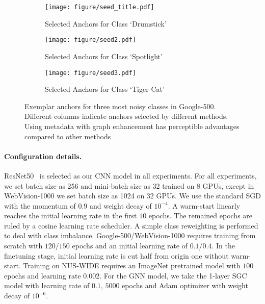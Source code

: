 \documentclass[sigconf]{acmart}
\begin{document}
\begin{figure*}[t]
	\centering
	\begin{subfigure}{\textwidth}
		\centering
\texttt{[image: figure/seed\_title.pdf]}  
\caption{Selected Anchors for Class `Drumstick'}
\label{fig:anchor_drumstick}
	\end{subfigure}
	\begin{subfigure}{\textwidth}
		\centering
\texttt{[image: figure/seed2.pdf]}  
\caption{Selected Anchors for Class `Spotlight'}
\label{fig:anchor_spotlight}
	\end{subfigure}
	
	\begin{subfigure}{\textwidth}
		\centering
\texttt{[image: figure/seed3.pdf]}  
\caption{Selected Anchors for Class `Tiger Cat'}
\label{fig:anchor_tigercat}
	\end{subfigure}
	




	\caption{Exemplar anchors for three most noisy classes in Google-500. Different columns indicate anchors selected by different methods. Using metadata with graph enhancement has perceptible advantages compared to other methods}
	\label{fig:seed}
\end{figure*}


\paragraph{Configuration details.}
ResNet50~\cite{he2016deep} is selected as our CNN model in all experiments.
For all experiments, we set batch size as 256 and mini-batch size as 32 trained on 8 GPUs, except in WebVision-1000 we set batch size as 1024 on 32 GPUs. We use the standard SGD with the momentum of $0.9$ and weight decay of $10^{-4}$. A warm-start linearly reaches the initial learning rate in the first $10$ epochs. The remained epochs are ruled by a cosine learning rate scheduler. A simple class reweighting is performed to deal with class imbalance. Google-500/WebVision-1000 requires training from scratch with $120$/$150$ epochs and an initial learning rate of $0.1$/$0.4$. 
In the finetuning stage, initial learning rate is cut half from origin one without warm-start.
Training on NUS-WIDE requires an ImageNet pretrained model with $100$ epochs and learning rate $0.002$.
For the GNN model, we take the 1-layer SGC model with learning rate of $0.1$, $5000$ epochs and Adam optimizer with weight decay of $10^{-6}$.
\end{document}
